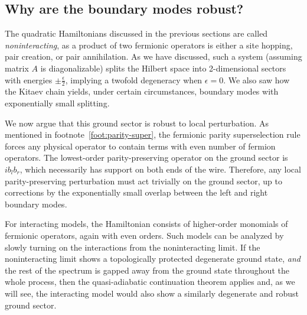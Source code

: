 \documentclass{article}
\begin{document}
\subsection{Why are the boundary modes robust?}\label{sec:robust}
The quadratic Hamiltonians discussed in the previous sections are called \emph{noninteracting},
as a product of two fermionic operators is either a site hopping, pair creation, or pair annihilation.
As we have discussed, such a system (assuming matrix $A$ is diagonalizable) splits the Hilbert space
into 2-dimensional sectors with energies $\pm \frac{\epsilon}{2}$,
implying a twofold degeneracy when $\epsilon = 0$.
We also saw how the Kitaev chain yields, under certain circumstances,
boundary modes with exponentially small splitting.

We now argue that this ground sector is robust to local perturbation.
As mentioned in footnote~\ref{foot:parity-super}, the fermionic parity superselection rule
forces any physical operator to contain terms with even number of fermion operators.
The lowest-order parity-preserving operator on the ground sector is $ib_l b_r$,
which necessarily has support on both ends of the wire.
Therefore, any local parity-preserving perturbation must act trivially on the ground sector,
up to corrections by the exponentially small overlap between the left and right boundary modes.

For interacting models, the Hamiltonian consists of higher-order monomials of fermionic operators,
again with even orders.
Such models can be analyzed by slowly turning on the interactions from the noninteracting limit.
If the noninteracting limit shows a topologically protected degenerate ground state,
\emph{and} the rest of the spectrum is gapped away from the ground state throughout the whole process,
then the quasi-adiabatic continuation theorem applies and, as we will see,
the interacting model would also show a similarly degenerate and robust ground sector.
\end{document}
